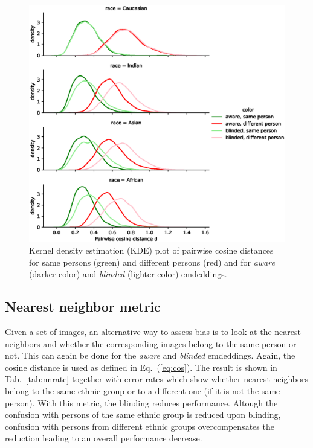 \documentclass{report}
\begin{document}
\begin{figure}
  \includegraphics[width=\textwidth]{bias.eps}
  \caption{Kernel density estimation (KDE) plot of pairwise cosine distances for same persons (green) and different persons (red) and for  \emph{aware} (darker color) and  \emph{blinded} (lighter color) emdeddings.}
  \label{fig:frrate}
\end{figure}

\subsection{Nearest neighbor metric}

Given a set of images, an alternative way to assess bias is to look at the nearest neighbors and whether the corresponding images belong to the same person or not. This can again be done for the \emph{aware}  and  \emph{blinded} emdeddings. Again, the cosine distance is used as defined in Eq.~(\ref{eq:cos}). The result is shown in Tab.~\ref{tab:nnrate} together with error rates which show whether nearest neighbors belong to the same ethnic group or to a different one (if it is not the same person). With this metric, the blinding reduces performance. Altough the confusion with persons of the same ethnic group is reduced upon blinding, confusion with persons from different ethnic groups overcompensates the reduction leading to an overall performance decrease.   
\end{document}
